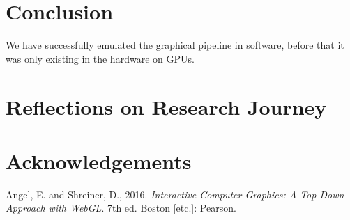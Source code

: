 \documentclass[a4paper]{article}
\theoremstyle{mytheoremstyle}
\theoremstyle{mytheoremstyle}
\theoremstyle{myproblemstyle}
\begin{document}


\section{Conclusion}
We have successfully emulated the graphical pipeline in software, before that it was only existing in the hardware on GPUs.

\section{Reflections on Research Journey}

\section{Acknowledgements}
\begin{thebibliography}{9}
    Angel, E. and Shreiner, D., 2016. \emph{Interactive Computer Graphics: A Top-Down Approach with WebGL}. 7th ed. Boston [etc.]: Pearson.
\end{thebibliography}
\end{document}
